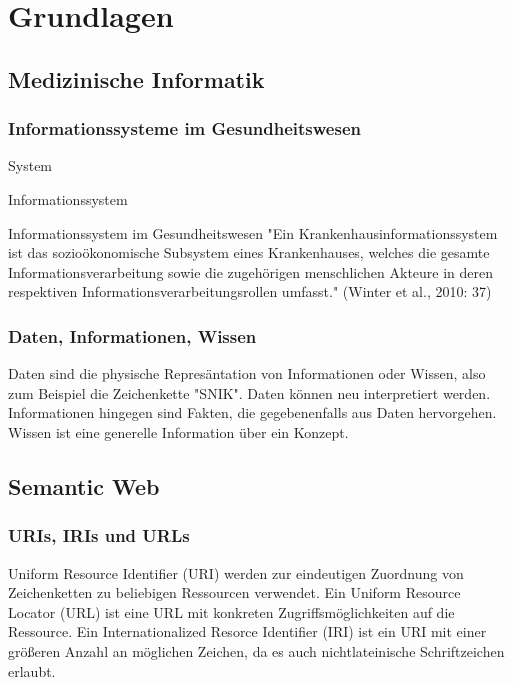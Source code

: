 \chapter{Grundlagen}\label{ch:preliminaries}

\section{Medizinische Informatik}

\subsection{Informationssysteme im Gesundheitswesen}

\begin{definition}{System}

\end{definition}

\begin{definition}{Informationssystem}

\end{definition}

\begin{definition}{Informationssystem im Gesundheitswesen}
"Ein Krankenhausinformationssystem ist das sozioökonomische Subsystem eines Krankenhauses, welches die gesamte Informationsverarbeitung sowie die zugehörigen menschlichen Akteure in deren respektiven Informationsverarbeitungsrollen umfasst." (Winter et al., 2010: 37)
\end{definition}

\subsection{Daten, Informationen, Wissen}
Daten sind die physische Represäntation von Informationen oder Wissen, also zum Beispiel die Zeichenkette "SNIK". Daten können neu interpretiert werden.
Informationen hingegen sind Fakten, die gegebenenfalls aus Daten hervorgehen.
Wissen ist eine generelle Information über ein Konzept.

\section{Semantic Web}

\subsection{URIs, IRIs und URLs}
Uniform Resource Identifier (URI) werden zur eindeutigen Zuordnung von Zeichenketten zu beliebigen Ressourcen verwendet.
Ein Uniform Resource Locator (URL) ist eine URL mit konkreten Zugriffsmöglichkeiten auf die Ressource.
Ein Internationalized Resorce Identifier (IRI) ist ein URI mit einer größeren Anzahl an möglichen Zeichen, da es auch nichtlateinische Schriftzeichen erlaubt.

